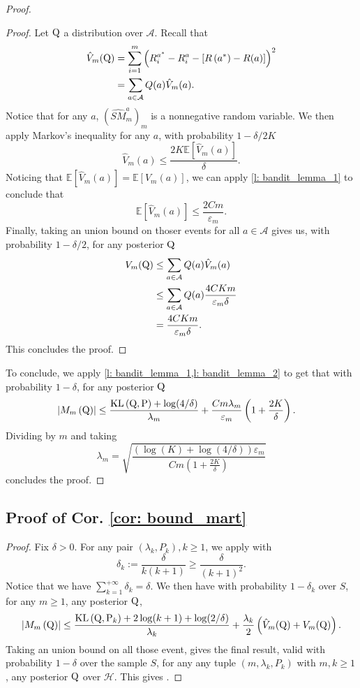 \begin{noaddcontents}
\begin{proof}
\begin{proof}
Let $\mathrm{Q}$ a distribution over $\mathcal{A}$. Recall that
\begin{align*}
\hat{V}_m(\mathrm{Q}) & = \sum_{i=1}^m \left(R_i^{a^*}-R_i^a-\left[R\left(a^*\right)-R(a)\right]\right)^2 \\
& = \sum_{a\in\mathcal{A}} Q(a) \hat{V}_m(a).
\end{align*}
Notice that for any $a$, $(\hat{SM}_m^a)_m$ is a  nonnegative random variable. We then apply Markov's inequality for any $a$, with probability $1-\delta/2K$
\[ \hat{V}_m(a)\leq  \frac{2K\mathbb{E}[\hat{V}_m(a)]}{\delta} .  \]
Noticing that $\mathbb{E}[\hat{V}_m(a)] = \mathbb{E}[V_m(a)]$, we can apply \cref{l: bandit_lemma_1} to conclude that
$$\mathbb{E}[\hat{V}_m(a)] \leq \frac{2Cm}{\varepsilon_m}.$$
Finally, taking an union bound on thoser events for all $a\in\mathcal{A}$ gives us, with probability $1-\delta/2$, for any posterior $\mathrm{Q}$
\begin{align*}
V_m(\mathrm{Q}) & \leq \sum_{a\in\mathcal{A}} Q(a) \hat{V}_m(a) \\
& \leq \sum_{a\in\mathcal{A}} Q(a) \frac{4CKm}{\varepsilon_m\delta} \\
&= \frac{4CKm}{\varepsilon_m\delta}.
\end{align*}
This concludes the proof.
\end{proof}
To conclude, we apply \cref{l: bandit_lemma_1,l: bandit_lemma_2} to get that with probability $1-\delta$, for any posterior $\mathrm{Q}$
\begin{align*}
\left|M_m\left(\mathrm{Q}\right)\right| & \leq \frac{\operatorname{KL}\left(\mathrm{Q}, \mathrm{P}\right) +\log (4/\delta)}{\lambda_m}+ \frac{Cm\lambda_m}{\varepsilon_m} \left(1+ \frac{2K}{\delta}    \right).
\end{align*}
Dividing by $m$ and taking $$\lambda_m= \sqrt{\frac{\left(\log(K) +\log (4/\delta)\right) \varepsilon_m}{Cm\left(1+ \frac{2K}{\delta}    \right)}}$$ concludes the proof.

\end{proof}





\subsection{Proof of Cor. \ref{cor: bound_mart}}


\begin{proof}
Fix $\delta>0$. For any pair $(\lambda_k,P_k), k\geq 1$, we apply  with $$\delta_k := \frac{\delta}{k(k+1)} \geq \frac{\delta}{(k+1)^2}. $$
Notice that we have $\sum_{k=1}^{+\infty} \delta_k = \delta$.
We then have with probability $1-\delta_k$ over $S$, for any $m\geq 1$, any posterior $\mathrm{Q}$,
\[ \left|M_m\left(\mathrm{Q}\right)\right| \leq \frac{\mathrm{KL}\left(\mathrm{Q}, \mathrm{P}_k\right)+2 \log (k+1)+\log (2/\delta)}{\lambda_k}+ \frac{\lambda_k}{2}\left( \hat{V}_m(\mathrm{Q}) + V_m(\mathrm{Q}) \right).\]
Taking an union bound on all those event, gives the final result, valid with probability $1-\delta$ over the sample $S$, for any any tuple $(m,\lambda_k,P_k)$ with $m,k\geq 1$, any posterior $\mathrm{Q}$ over $\mathcal{H}$. This gives .


\end{proof}
\end{noaddcontents}
